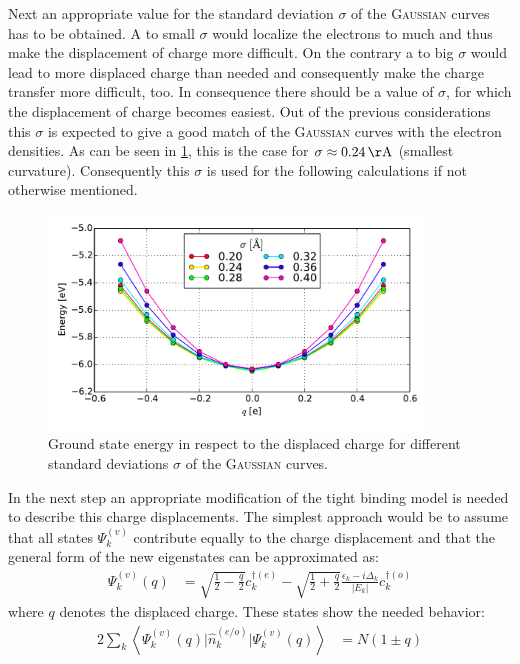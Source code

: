 Next an appropriate value for the standard deviation $\sigma$ of the \textsc{Gaussian} curves has to be obtained. A to small $\sigma$ would localize the electrons to much and thus make the displacement of charge more difficult. On the contrary a to big $\sigma$ would lead to more displaced charge than needed and consequently make the charge transfer more difficult, too. In consequence there should be a value of $\sigma$, for which the displacement of charge becomes easiest. Out of the previous considerations this $\sigma$ is expected to give a good match of the \textsc{Gaussian} curves with the electron densities. As can be seen in \cref{image_gaussian_sigmas_hydrogen}, this is the case for $\sigma \approx \unit[0.24]{\AA}$ (smallest curvature). Consequently this $\sigma$ is used for the following calculations if not otherwise mentioned.\\
\begin{figure}
	\centering
	\includegraphics[width = 10cm]{Images/Hydrogen/charging/gaussian_sigmas}
	\caption{Ground state energy in respect to the displaced charge for different standard deviations $\sigma$ of the \textsc{Gaussian} curves.}
	\label{image_gaussian_sigmas_hydrogen}
\end{figure}
In the next step an appropriate modification of the tight binding model is needed to describe this charge displacements. The simplest approach would be to assume that all states $\Psi_k^{(v)}$ contribute equally to the charge displacement and that the general form of the new eigenstates can be approximated as:
\begin{align}
\Psi_k^{(v)}(q) &= \sqrt{\frac{1}{2}-\frac{q}{2}}c_k^{\dagger(e)}- \sqrt{\frac{1}{2}+\frac{q}{2}}\frac{\epsilon_k - i \Delta_k}{|E_k|}c_{k}^{\dagger(o)}
\end{align}
where $q$ denotes the displaced charge. These states show the needed behavior:
\begin{align}
	2\sum_k\left\langle\Psi_k^{(v)}(q)\Big|\hat{n}_k^{(e/o)}\Big|\Psi_k^{(v)}(q)\right\rangle &= N \left(1 \pm q\right)
\end{align}
